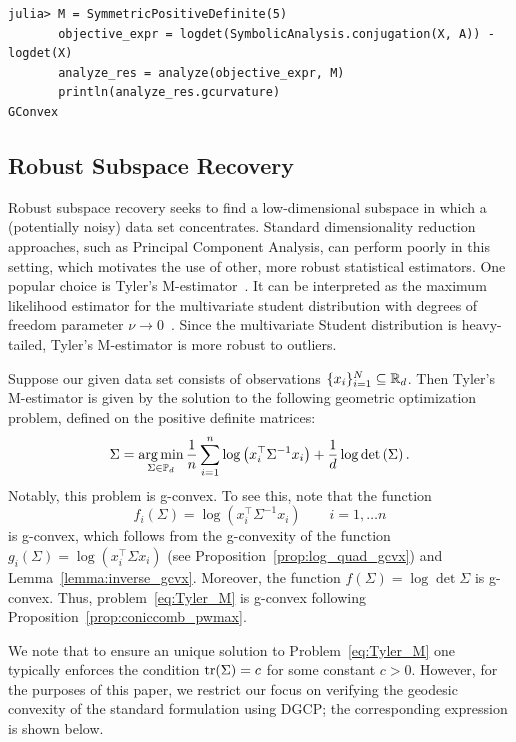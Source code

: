 \documentclass[twoside,11pt]{article}
\begin{document}
\begin{listing}[h!]
    \begin{verbatim}
julia> M = SymmetricPositiveDefinite(5)
       objective_expr = logdet(SymbolicAnalysis.conjugation(X, A)) - logdet(X)
       analyze_res = analyze(objective_expr, M)
       println(analyze_res.gcurvature)
GConvex
    \end{verbatim}
\end{listing}


\subsection{Robust Subspace Recovery}
Robust subspace recovery seeks to find a low-dimensional subspace in which a (potentially noisy) data set concentrates. Standard dimensionality reduction approaches, such as Principal Component Analysis, can perform poorly in this setting, which motivates the use of other, more robust statistical estimators. One popular choice is Tyler's M-estimator~\citep{Tyler1987}. It can be interpreted as the maximum likelihood estimator for the multivariate student distribution with degrees of freedom parameter $\nu \to 0$~\citep{Maronna2006}. Since the multivariate Student distribution is heavy-tailed, Tyler's M-estimator is more robust to outliers.

Suppose our given data set consists of observations $\{x_i\}_{i=1}^N \subseteq \mathbb{R}_d$. Then Tyler's M-estimator is given by the solution to the following geometric optimization problem, defined on the positive definite matrices:
\begin{equation}\label{eq:Tyler_M}
    \Sigma = \operatorname*{arg\,min}_{\Sigma \in \mathbb{P}_d} \frac{1}{n}\sum_{i=1}^n \log \left(x_i^\top \Sigma^{-1}x_i\right) + \frac{1}{d}\log \det \left(\Sigma \right).
\end{equation}
Notably, this problem is g-convex. To see this, note that the function 
\[
f_i(\Sigma) = \log \left(x_i^\top \Sigma^{-1}x_i\right) \qquad i = 1, \ldots n
\]
is g-convex, which follows from the g-convexity of the function $g_i(\Sigma) = \log \left( x_i^\top \Sigma x_i\right)$ (see Proposition~\ref{prop:log_quad_gcvx}) and Lemma~\ref{lemma:inverse_gcvx}. Moreover, the function $f(\Sigma) = \log \det \Sigma$ is g-convex. Thus, problem~\ref{eq:Tyler_M} is g-convex following Proposition~\ref{prop:coniccomb_pwmax}.

 We note that to ensure an unique solution to Problem~\eqref{eq:Tyler_M} one typically enforces the condition $\text{tr} (\Sigma) = c$ for some constant $c > 0$. However, for the purposes of this paper, we restrict our focus on verifying the geodesic convexity of the standard formulation using DGCP; the corresponding expression is shown below.
\end{document}
